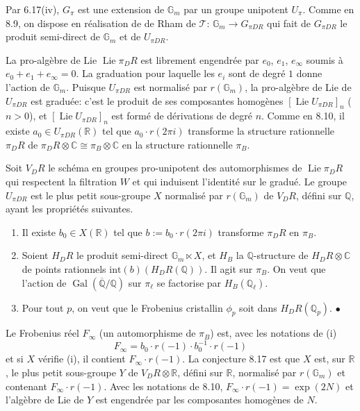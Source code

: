 \documentclass[12pt,a4paper]{article}
\theoremstyle{plain}
\theoremstyle{definition}
\theoremstyle{remark}
\DeclareMathOperator{\Lie}{Lie}
\DeclareMathOperator{\Gal}{Gal}
\newcommand{\Betti}{B}
\newcommand{\dR}{DR}
\newcommand{\Gm}{\mathbb{G}_m}
\newcommand{\QQ}{\mathbb{Q}}
\newcommand{\CC}{\mathbb{C}}
\newcommand{\RR}{\mathbb{R}}
\begin{document}
Par 6.17(iv), $G_\pi$ est une extension de $\Gm$ par un groupe unipotent
$U_\pi$. Comme en 8.9, on dispose en r\'ealisation de de Rham de
$\mathcal{T}$: $\Gm \to G_{\pi\dR}$ qui fait de $G_{\pi\dR}$ le produit
semi-direct de $\Gm$ et de $U_{\pi\dR}$.

La pro-alg\`ebre de Lie $\Lie \pi_\dR$ est librement engendr\'ee par
$e_0$, $e_1$, $e_\infty$ soumis \`a $e_0+e_1+e_\infty = 0$. La graduation
pour laquelle les $e_i$ sont de degr\'e $1$ donne l'action de $\Gm$.
Puisque $U_{\pi\dR}$ est normalis\'e par $r(\Gm)$, la pro-alg\`ebre de
Lie de $U_{\pi\dR}$ est gradu\'ee: c'est le produit de ses composantes
homog\`enes $[\Lie U_{\pi\dR}]_n$ ($n > 0$), et
$[\Lie U_{\pi\dR}]_n$ est form\'e de d\'erivations de degr\'e $n$. Comme
en 8.10, il existe $a_0 \in U_{\pi\dR}(\RR)$ tel que
$a_0 \cdot r(2\pi i)$ transforme la structure rationnelle $\pi_\dR$ de
$\pi_\dR \otimes \CC \cong \pi_\Betti \otimes \CC$ en la structure
rationnelle $\pi_\Betti$.

Soit $V_\dR$ le sch\'ema en groupes pro-unipotent des automorphismes de
$\Lie \pi_\dR$ qui respectent la filtration $W$ et qui induisent
l'identit\'e sur le gradu\'e. Le groupe $U_{\pi\dR}$ est le plus petit
sous-groupe $X$ normalis\'e par $r(\Gm)$ de $V_\dR$, d\'efini sur $\QQ$,
ayant les propri\'et\'es suivantes.
\begin{enumerate}
\item[(i)] Il existe $b_0 \in X(\RR)$ tel que $b := b_0 \cdot r(2\pi i)$
transforme $\pi_\dR$ en $\pi_\Betti$.
\item[(ii)] Soient $H_\dR$ le produit semi-direct $\Gm \ltimes X$, et
$H_\Betti$ la $\QQ$-structure de $H_\dR \otimes \CC$ de points rationnels
$\mathrm{int}(b)(H_\dR(\QQ))$. Il agit sur $\pi_\Betti$. On veut que
l'action de $\Gal(\overline{\QQ}/\QQ)$ sur $\pi_\ell$ se factorise par
$H_\Betti(\QQ_\ell)$.
\item[(iii)] Pour tout $p$, on veut que le Frobenius cristallin
$\phi_p$ soit dans $H_\dR(\QQ_p)$. \hfill $\bullet$
\end{enumerate}

Le Frobenius r\'eel $F_\infty$ (un automorphisme de $\pi_\Betti$) est,
avec les notations de (i)
\[
F_\infty = b_0 \cdot r(-1) \cdot b_0^{-1} \cdot r(-1)
\]
et si $X$ v\'erifie (i), il contient $F_\infty \cdot r(-1)$. La conjecture
8.17 est que $X$ est, sur $\RR$, le plus petit sous-groupe $Y$ de
$V_\dR \otimes \RR$, d\'efini sur $\RR$, normalis\'e par $r(\Gm)$ et
contenant $F_\infty \cdot r(-1)$. Avec les notations de 8.10,
$F_\infty \cdot r(-1) = \exp(2N)$ et l'alg\`ebre de Lie de $Y$ est
engendr\'ee par les composantes homog\`enes de $N$.
\end{document}
